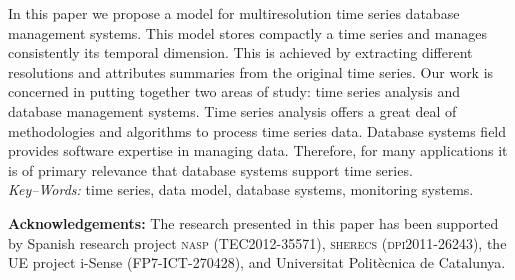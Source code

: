 \documentclass[twocolumn,11pt,a4paper]{article}
\begin{document}
{\begin{minipage}[b]{6.9in}
    In this paper we propose a model for multiresolution time series
    database management systems. This model stores compactly a time series
    and manages consistently its temporal dimension. This is achieved by
    extracting different resolutions and attributes summaries from the
    original time series.
    Our work is concerned in putting together two areas of study: time
    series analysis and database management systems. Time series analysis
    offers a great deal of methodologies and algorithms to process time
    series data. Database systems field provides software expertise in
    managing data. Therefore, for many applications it is of primary
    relevance that database systems support time series.
    \\[4mm] \textit{Key--Words:}
    time series, data model, database systems, monitoring systems.
  \end{minipage}
  \vspace{-10pt}
}

\maketitle

\thispagestyle{empty} \pagestyle{empty}
%
%









\vspace{5pt plus 5pt} 
\noindent \textbf{Acknowledgements:} The research presented in this
paper has been supported by Spanish research project \textsc{nasp
  (TEC2012-35571)}, \textsc{sherecs (dpi2011-26243)}, the UE project
i-Sense ({\small FP7-ICT-270428}), and Universitat Polit\`{e}cnica de
Catalunya.

\printbibliography{}
\end{document}
